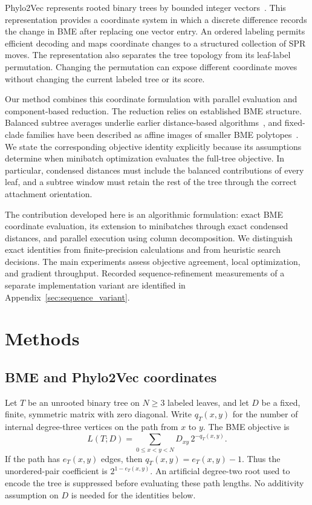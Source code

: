 \documentclass[11pt,a4paper]{article}
\makeatletter
\DeclareRobustCommand{\_}{\ifmmode\nfss@text{\textunderscore}\else\textunderscore\allowbreak\fi}
\theoremstyle{definition}
\makeatother
\begin{document}
Phylo2Vec represents rooted binary trees by bounded integer vectors~\cite{penn2024phylo2vec}.
This representation provides a coordinate system in which a discrete difference records the change in BME after replacing one vector entry.
An ordered labeling permits efficient decoding and maps coordinate changes to a structured collection of SPR moves.
The representation also separates the tree topology from its leaf-label permutation.
Changing the permutation can expose different coordinate moves without changing the current labeled tree or its score.

Our method combines this coordinate formulation with parallel evaluation and component-based reduction.
The reduction relies on established BME structure.
Balanced subtree averages underlie earlier distance-based algorithms~\cite{desper2002fast,desper2004theory}, and fixed-clade families have been described as affine images of smaller BME polytopes~\cite[Section~2.4]{haws2011optimality}.
We state the corresponding objective identity explicitly because its assumptions determine when minibatch optimization evaluates the full-tree objective.
In particular, condensed distances must include the balanced contributions of every leaf, and a subtree window must retain the rest of the tree through the correct attachment orientation.

The contribution developed here is an algorithmic formulation: exact BME coordinate evaluation, its extension to minibatches through exact condensed distances, and parallel execution using column decomposition.
We distinguish exact identities from finite-precision calculations and from heuristic search decisions.
The main experiments assess objective agreement, local optimization, and gradient throughput.
Recorded sequence-refinement measurements of a separate implementation variant are identified in Appendix~\ref{sec:sequence_variant}.

\section{Methods}
\label{sec:math}

\subsection{BME and Phylo2Vec coordinates}

Let $T$ be an unrooted binary tree on $N\geq3$ labeled leaves, and let $D$ be a fixed, finite, symmetric matrix with zero diagonal.
Write $q_T(x,y)$ for the number of internal degree-three vertices on the path from $x$ to $y$.
The BME objective is
\begin{equation}
 L(T;D)=\sum_{0\leq x<y<N}D_{xy}\,2^{-q_T(x,y)}.
 \label{eq:pauplin}
\end{equation}
If the path has $e_T(x,y)$ edges, then $q_T(x,y)=e_T(x,y)-1$.
Thus the unordered-pair coefficient is $2^{1-e_T(x,y)}$.
An artificial degree-two root used to encode the tree is suppressed before evaluating these path lengths.
No additivity assumption on $D$ is needed for the identities below.
\end{document}
